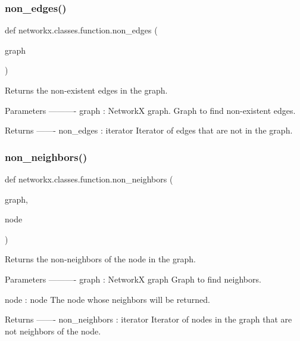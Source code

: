 \subsubsection{\texorpdfstring{non\+\_\+edges()}{non\_edges()}}
{\footnotesize\ttfamily def networkx.\+classes.\+function.\+non\+\_\+edges (\begin{DoxyParamCaption}\item[{}]{graph }\end{DoxyParamCaption})}

\begin{DoxyVerb}Returns the non-existent edges in the graph.

Parameters
----------
graph : NetworkX graph.
    Graph to find non-existent edges.

Returns
-------
non_edges : iterator
    Iterator of edges that are not in the graph.
\end{DoxyVerb}
 \mbox{\label{namespacenetworkx_1_1classes_1_1function_a08a939874452e715ec658b8450a874d3}} 
\subsubsection{\texorpdfstring{non\+\_\+neighbors()}{non\_neighbors()}}
{\footnotesize\ttfamily def networkx.\+classes.\+function.\+non\+\_\+neighbors (\begin{DoxyParamCaption}\item[{}]{graph,  }\item[{}]{node }\end{DoxyParamCaption})}

\begin{DoxyVerb}Returns the non-neighbors of the node in the graph.

Parameters
----------
graph : NetworkX graph
    Graph to find neighbors.

node : node
    The node whose neighbors will be returned.

Returns
-------
non_neighbors : iterator
    Iterator of nodes in the graph that are not neighbors of the node.
\end{DoxyVerb}
 \mbox{\label{namespacenetworkx_1_1classes_1_1function_a5acb37106c18fd48082b43f2a2b69fb2}} 
